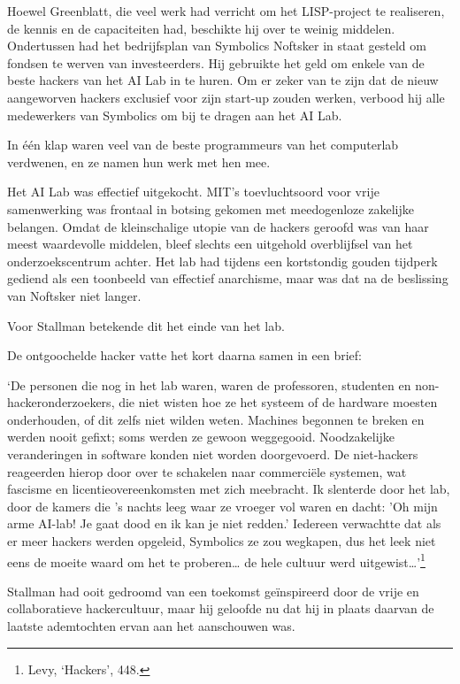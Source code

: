 \documentclass[smalldemyvopaper,11pt,twoside,onecolumn,openright,extrafontsizes,hidelinks]{memoir}
\begin{document}
Hoewel Greenblatt, die veel werk had verricht om het LISP-project te
realiseren, de kennis en de capaciteiten had, beschikte hij over te
weinig middelen. Ondertussen had het bedrijfsplan van Symbolics Noftsker
in staat gesteld om fondsen te werven van investeerders. Hij gebruikte
het geld om enkele van de beste hackers van het AI Lab in te huren. Om
er zeker van te zijn dat de nieuw aangeworven hackers exclusief voor
zijn start-up zouden werken, verbood hij alle medewerkers van Symbolics
om bij te dragen aan het AI Lab.

In één klap waren veel van de beste programmeurs van het computerlab
verdwenen, en ze namen hun werk met hen mee.

Het AI Lab was effectief uitgekocht. MIT's toevluchtsoord voor vrije
samenwerking was frontaal in botsing gekomen met meedogenloze zakelijke
belangen. Omdat de kleinschalige utopie van de hackers geroofd was van
haar meest waardevolle middelen, bleef slechts een uitgehold
overblijfsel van het onderzoekscentrum achter. Het lab had tijdens een
kortstondig gouden tijdperk gediend als een toonbeeld van effectief
anarchisme, maar was dat na de beslissing van Noftsker niet langer.

Voor Stallman betekende dit het einde van het lab.

De ontgoochelde hacker vatte het kort daarna samen in een brief:

`De personen die nog in het lab waren, waren de professoren, studenten
en non-hackeronderzoekers, die niet wisten hoe ze het systeem of de
hardware moesten onderhouden, of dit zelfs niet wilden weten. Machines
begonnen te breken en werden nooit gefixt; soms werden ze gewoon
weggegooid. Noodzakelijke veranderingen in software konden niet worden
doorgevoerd. De niet-hackers reageerden hierop door over te schakelen
naar commerciële systemen, wat fascisme en licentieovereenkomsten met
zich meebracht. Ik slenterde door het lab, door de kamers die 's nachts
leeg waar ze vroeger vol waren en dacht: 'Oh mijn arme AI-lab! Je gaat
dood en ik kan je niet redden.' Iedereen verwachtte dat als er meer
hackers werden opgeleid, Symbolics ze zou wegkapen, dus het leek niet
eens de moeite waard om het te proberen\ldots{} de hele cultuur werd
uitgewist\ldots'\footnote{\hspace{0pt}Levy, `Hackers', 448.}

Stallman had ooit gedroomd van een toekomst geïnspireerd door de vrije
en collaboratieve hackercultuur, maar hij geloofde nu dat hij in plaats
daarvan de laatste ademtochten ervan aan het aanschouwen was.
\end{document}
